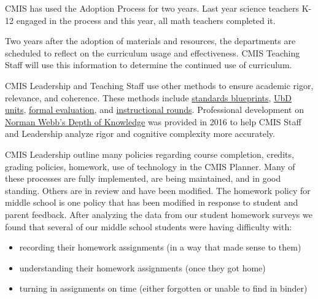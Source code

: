 \documentclass{report}
\begin{document}
\begin{findings}
CMIS has used the Adoption Process for two years. Last year science teachers K-12 engaged in the process and this year, all math teachers completed it. 

Two years after the adoption of materials and resources, the departments are scheduled to reflect on the curriculum usage and effectiveness. CMIS Teaching Staff will use this information to determine the continued use of curriculum. 


CMIS Leadership and Teaching Staff use other methods to ensure academic rigor, relevance, and coherence. These methods include \href{https://drive.google.com/drive/folders/0ByVFfrm0zfolfmV1QTNuWFdUVHV3dDVrRFMzUFBMazY0VGs1eWc0cmFjVGcwNDdsQkdrZzA?usp=sharing}{standards blueprints}, \href{https://docs.google.com/a/cmis.ac.th/document/d/1kL1VjwfuMMa7NaWmwUrEah1BM-jJRmLAd4VJzR3HoPs/edit?usp=sharing}{UbD units}, \href{https://docs.google.com/document/d/1AlY83UtysbjvAIvfp4hKRa1Ktu0FhEHAOAMKYI9ai1M/edit?usp=sharing}{formal evaluation}, and \href{https://docs.google.com/a/cmis.ac.th/presentation/d/1j9DjUPHbIprWWbftcBxiF35BKmzU5C_lW9Z78f8CAeE/edit?usp=sharing}{instructional rounds}.  Professional development on \href{https://drive.google.com/a/cmis.ac.th/file/d/0ByVFfrm0zfolNVJmeEJwcHUxbjg/view?usp=sharing}{Norman Webb’s Depth of Knowledge} was provided in 2016 to help CMIS Staff and Leadership analyze rigor and cognitive complexity more accurately. 


CMIS Leadership outline many policies regarding course completion, credits, grading policies, homework, use of technology in the CMIS Planner. Many of these processes are fully implemented, are being maintained, and in good standing. Others are in review and have been modified. The homework policy for middle school is one policy that has been modified in response to student and parent feedback.  After analyzing the data from our student homework surveys we found that several of our middle school students were having difficulty with:

\begin{itemize}
\item recording their homework assignments (in a way that made sense to them)
\item understanding their homework assignments (once they got home) 
\item turning in assignments on time (either forgotten or unable to find in binder)
\end{itemize}


\end{findings}
\end{document}
